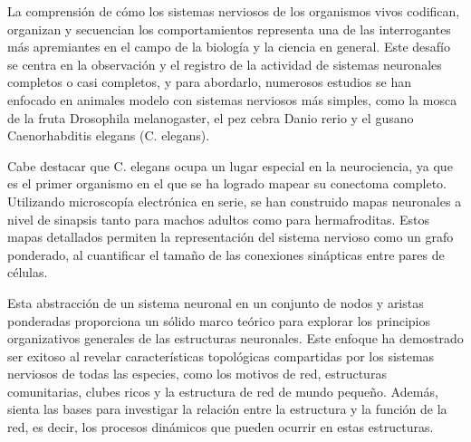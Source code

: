 %
%
%
%
%
%


La comprensión de cómo los sistemas nerviosos de los organismos vivos codifican, organizan y secuencian los comportamientos representa una de las interrogantes más apremiantes en el campo de la biología y la ciencia en general. Este desafío se centra en la observación y el registro de la actividad de sistemas neuronales completos o casi completos, y para abordarlo, numerosos estudios se han enfocado en animales modelo con sistemas nerviosos más simples, como la mosca de la fruta Drosophila melanogaster, el pez cebra Danio rerio y el gusano Caenorhabditis elegans (C. elegans).

Cabe destacar que C. elegans ocupa un lugar especial en la neurociencia, ya que es el primer organismo en el que se ha logrado mapear su conectoma completo. Utilizando microscopía electrónica en serie, se han construido mapas neuronales a nivel de sinapsis tanto para machos adultos como para hermafroditas. Estos mapas detallados permiten la representación del sistema nervioso como un grafo ponderado, al cuantificar el tamaño de las conexiones sinápticas entre pares de células.

Esta abstracción de un sistema neuronal en un conjunto de nodos y aristas ponderadas proporciona un sólido marco teórico para explorar los principios organizativos generales de las estructuras neuronales. Este enfoque ha demostrado ser exitoso al revelar características topológicas compartidas por los sistemas nerviosos de todas las especies, como los motivos de red, estructuras comunitarias, clubes ricos y la estructura de red de mundo pequeño. Además, sienta las bases para investigar la relación entre la estructura y la función de la red, es decir, los procesos dinámicos que pueden ocurrir en estas estructuras.

